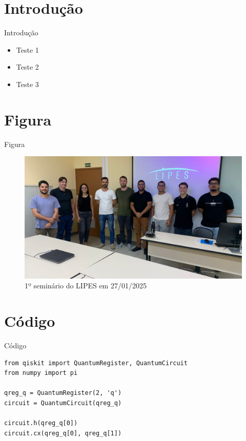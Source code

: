 \documentclass[aspectratio=169,english]{beamer}
\begin{document}







\section{Introdução}
\begin{frame}{Introdução}
    \begin{itemize}
        \item Teste 1
        \item Teste 2
        \item Teste 3
    \end{itemize}
\end{frame}

\section{Figura}
\begin{frame}{Figura}
    \begin{figure}
        \centering
        \includegraphics[width=0.6\linewidth]{imagens/1_seminario_LIPES.jpeg}
        \caption{1º seminário do LIPES em 27/01/2025}
        \label{fig:1semlipes}
    \end{figure}
\end{frame}

\section{Código}
\begin{frame}[fragile]{Código}
\begin{verbatim}
from qiskit import QuantumRegister, QuantumCircuit
from numpy import pi

qreg_q = QuantumRegister(2, 'q')
circuit = QuantumCircuit(qreg_q)

circuit.h(qreg_q[0])
circuit.cx(qreg_q[0], qreg_q[1])
\end{verbatim}
\end{frame}
\end{document}
